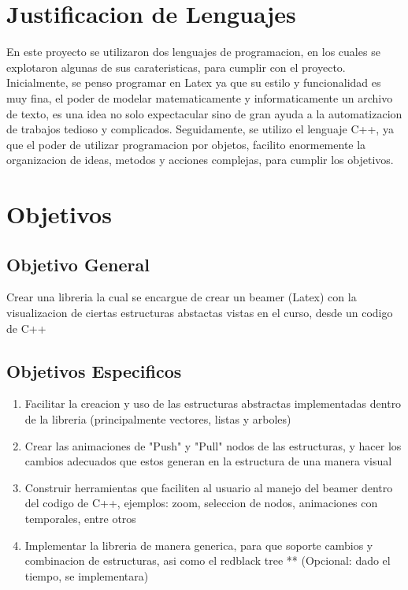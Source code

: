 \documentclass[12pt,letterpaper]{article}     %
\begin{document}
\section{Justificacion de Lenguajes}

En este proyecto se utilizaron dos lenguajes de programacion, en los cuales se explotaron algunas de sus carateristicas, para cumplir con el proyecto. Inicialmente, se penso programar en Latex ya que su estilo y funcionalidad es muy fina, el poder de modelar matematicamente y informaticamente un archivo de texto, es una idea no solo expectacular sino de gran ayuda a la automatizacion de trabajos tedioso y complicados. Seguidamente, se utilizo el lenguaje C++, ya que el poder de utilizar programacion por objetos, facilito enormemente la organizacion de ideas, metodos y acciones complejas, para cumplir los objetivos.



\section{Objetivos}

\subsection{Objetivo General} 

Crear una libreria la cual se encargue de crear un beamer (Latex) con la visualizacion de ciertas estructuras abstactas vistas en el curso, desde un codigo de C++


\subsection{Objetivos Especificos}


\begin{enumerate}
\item Facilitar la creacion y uso de las estructuras abstractas implementadas dentro de la libreria (principalmente vectores, listas y arboles) 
\item Crear las animaciones de "Push" y "Pull" nodos de las estructuras, y hacer los cambios adecuados que estos generan en la estructura de una manera visual
\item Construir herramientas que faciliten al usuario al manejo del beamer dentro del codigo de C++, ejemplos: zoom, seleccion de nodos, animaciones con temporales, entre otros
\item Implementar la libreria de manera generica, para que soporte cambios y combinacion de estructuras, asi como el redblack tree ** (Opcional: dado el tiempo, se implementara)
\end{enumerate}
\end{document}
